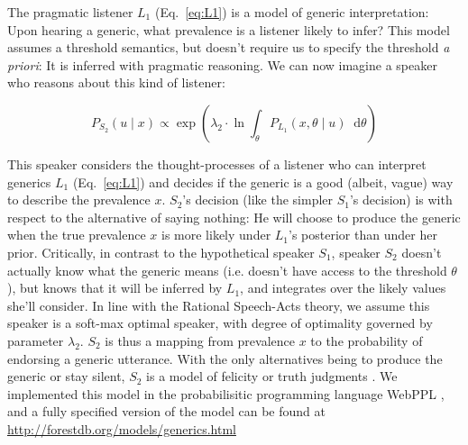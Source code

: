 \documentclass[12pt,letterpaper]{article}
\newcommand*\diff{\mathop{}\!\mathrm{d}}
\begin{document}
The pragmatic listener $L_1$ (Eq.~\ref{eq:L1}) is a model of generic interpretation: Upon hearing a generic, what prevalence is a listener likely to infer?
This model assumes a threshold semantics, but doesn't require us to specify the threshold \emph{a priori}: It is inferred with pragmatic reasoning.
We can now imagine a speaker who reasons about this kind of listener:

\begin{equation} 
P_{S_{2}}(u \mid x) \propto  \exp{(\lambda_2 \cdot \ln \int_{\theta} P_{L_{1}}(x , \theta \mid u) \diff \theta ) }%
\label{eq:S2}
\end{equation}

This speaker considers the thought-processes of a listener who can interpret generics $L_1$ (Eq.~\ref{eq:L1}) and decides if the generic is a good (albeit, vague) way to describe the  prevalence $x$. 
$S_2$'s decision (like the simpler $S_1$'s decision) is with respect to the alternative of saying nothing: He will choose to produce the generic when the true prevalence $x$ is more likely under $L_1$'s posterior than under her prior. 
Critically, in contrast to the hypothetical speaker $S_1$, speaker $S_{2}$ doesn't actually know what the generic means (i.e. doesn't have access to the threshold $\theta$), but knows that it will be inferred by $L_{1}$, and integrates over the likely values she'll consider.
In line with the Rational Speech-Acts theory, we assume this speaker is a soft-max optimal speaker, with degree of optimality governed by parameter $\lambda_2$.
$S_2$ is thus a mapping from prevalence $x$ to the probability of endorsing a generic utterance. 
With the only alternatives being to produce the generic or stay silent, $S_2$ is a model of felicity or truth judgments \cite{Degen2014}.
We implemented this model in the probabilisitic programming language WebPPL \cite{dippl}, and a fully specified version of the model can be found at \url{http://forestdb.org/models/generics.html}
\end{document}
